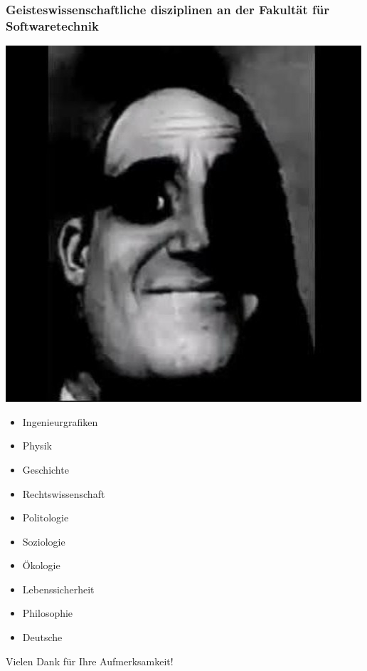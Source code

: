 \documentclass{beamer}
\begin{document}
\begin{frame}
\frametitle{Geisteswissenschaftliche disziplinen an der Fakultät für Softwaretechnik}
\begin{minipage}{0.5\textwidth}
\includegraphics[width=\textwidth]{img/bad.jpg}
\end{minipage}
\begin{minipage}{0.45\textwidth}
    \begin{itemize}
        \item<1-> Ingenieurgrafiken
        \item<2-> Physik
        \item<3-> Geschichte
        \item<4-> Rechtswissenschaft
        \item<5-> Politologie
        \item<6-> Soziologie
        \item<7-> \"Okologie
        \item<8-> Lebenssicherheit
        \item<9-> Philosophie
        \item<10-> Deutsche
    \end{itemize}
\end{minipage}
\end{frame}

\begingroup
\begin{frame}
    \vfill
\begin{center}
    \huge Vielen Dank f\"ur Ihre Aufmerksamkeit!
\end{center}
    \vfill
\end{frame}
\endgroup
\end{document}
